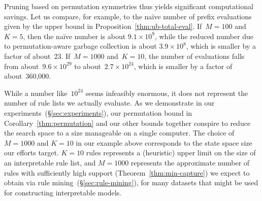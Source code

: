 Pruning based on permutation symmetries thus yields significant
computational savings.
%
Let us compare, for example, to the na\"ive number of prefix evaluations
given by the upper bound in Proposition~\ref{thm:ub-total-eval}.
%
If~${M = 100}$ and~${K = 5}$, then the na\"ive number is about
${9.1 \times 10^9}$, while the reduced number due to permutation-aware
garbage collection is about ${3.9 \times 10^8}$,
which is smaller by a factor of about~23.
%
If~${M=1000}$ and~${K = 10}$, the number of evaluations falls from
about~${9.6 \times 10^{29}}$ to about~${2.7 \times 10^{24}}$,
which is smaller by a factor of about~360,000.
%

While a number like~$10^{24}$ seems infeasibly enormous,
it does not represent the number of rule lists we actually evaluate.
%
As we demonstrate in our experiments~(\S\ref{sec:experiments}),
our permutation bound in Corollary~\ref{thm:permutation}
and our other bounds together conspire to reduce the search space
to a size manageable on a single computer.
%
The choice of ${M=1000}$ and ${K=10}$ in our example above
corresponds to the state space size our efforts target.
%
${K=10}$ rules represents a (heuristic) upper limit on
the size of an interpretable rule list,
and ${M=1000}$ represents the approximate number of rules
with sufficiently high support (Theorem~\ref{thm:min-capture})
we expect to obtain via rule mining~(\S\ref{sec:rule-mining}),
for many datasets that might be used for constructing interpretable models.

